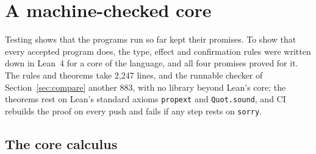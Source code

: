 \documentclass[11pt,a4paper]{article}
\begin{document}
\section{A machine-checked core}
\label{sec:proof}

Testing shows that the programs run so far kept their promises. To show
that every accepted program does, the type, effect and confirmation rules were
written down in Lean~4 \cite{lean4} for a core of the language, and all
four promises proved for it. The rules and theorems take 2,247 lines,
and the runnable checker of Section~\ref{sec:compare} another 883, with no
library beyond Lean's core; the theorems rest on Lean's standard axioms
\texttt{propext} and \texttt{Quot.sound}, and CI rebuilds the proof on
every push and fails if any step rests on \texttt{sorry}.

\subsection{The core calculus}
\end{document}
